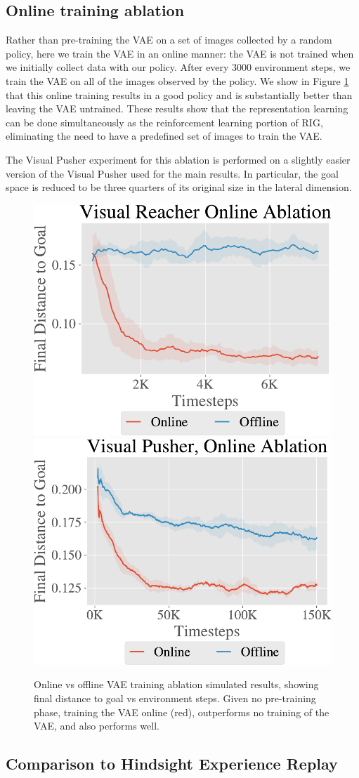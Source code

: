 \subsection{Online training ablation} \label{sec:appendix_online}
Rather than pre-training the VAE on a set of images collected by a random policy, here we train the VAE in an online manner: the VAE is not trained when we initially collect data with our policy.
After every 3000 environment steps, we train the VAE on all of the images observed by the policy.
We show in Figure \ref{fig:online-ablation-all-envs} that this online training results in a good policy and is substantially better than leaving the VAE untrained.
These results show that the representation learning can be done simultaneously as the reinforcement learning portion of RIG, eliminating the need to have a predefined set of images to train the VAE.

The Visual Pusher experiment for this ablation is performed on a slightly easier version of the Visual Pusher used for the main results.
In particular, the goal space is reduced to be three quarters of its original size in the lateral dimension.

\begin{figure}[h]
    \centering
    \includegraphics[height=0.2\linewidth]{rig/img/reacher_online_ablation.pdf}
    \includegraphics[height=0.2\linewidth]{rig/img/pusher_online_ablation.pdf}
    \caption{Online vs offline VAE training ablation simulated results, showing final distance to goal vs environment steps. Given no pre-training phase, training the VAE online (red), outperforms no training of the VAE, and also performs well.}
    \vspace{-0.1in}
    \label{fig:online-ablation-all-envs}
\end{figure}

\subsection{Comparison to Hindsight Experience Replay} \label{sec:her_relabeling_ablation}

